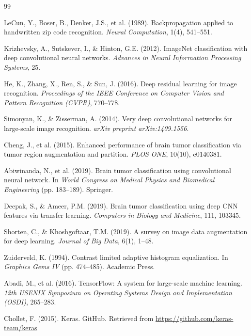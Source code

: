 \documentclass[12pt,a4paper]{article}
\begin{document}
\begin{thebibliography}{99}

 LeCun, Y., Boser, B., Denker, J.S., et al. (1989). Backpropagation applied to handwritten zip code recognition. \textit{Neural Computation}, 1(4), 541--551.

 Krizhevsky, A., Sutskever, I., \& Hinton, G.E. (2012). ImageNet classification with deep convolutional neural networks. \textit{Advances in Neural Information Processing Systems}, 25.

 He, K., Zhang, X., Ren, S., \& Sun, J. (2016). Deep residual learning for image recognition. \textit{Proceedings of the IEEE Conference on Computer Vision and Pattern Recognition (CVPR)}, 770--778.

 Simonyan, K., \& Zisserman, A. (2014). Very deep convolutional networks for large-scale image recognition. \textit{arXiv preprint arXiv:1409.1556}.

 Cheng, J., et al. (2015). Enhanced performance of brain tumor classification via tumor region augmentation and partition. \textit{PLOS ONE}, 10(10), e0140381.

 Abiwinanda, N., et al. (2019). Brain tumor classification using convolutional neural network. In \textit{World Congress on Medical Physics and Biomedical Engineering} (pp. 183--189). Springer.

 Deepak, S., \& Ameer, P.M. (2019). Brain tumor classification using deep CNN features via transfer learning. \textit{Computers in Biology and Medicine}, 111, 103345.

 Shorten, C., \& Khoshgoftaar, T.M. (2019). A survey on image data augmentation for deep learning. \textit{Journal of Big Data}, 6(1), 1--48.

 Zuiderveld, K. (1994). Contrast limited adaptive histogram equalization. In \textit{Graphics Gems IV} (pp. 474--485). Academic Press.

 Abadi, M., et al. (2016). TensorFlow: A system for large-scale machine learning. \textit{12th USENIX Symposium on Operating Systems Design and Implementation (OSDI)}, 265--283.

 Chollet, F. (2015). Keras. GitHub. Retrieved from \url{https://github.com/keras-team/keras}

\end{thebibliography}
\end{document}
